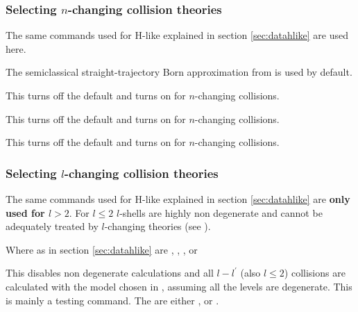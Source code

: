 

\subsubsection{Selecting $n$-changing collision theories}

The same commands used for H-like explained in section \ref{sec:datahlike} are 
used here.

 The semiclassical 
straight-trajectory Born approximation from \citet{Lebedevandbeigman1998} is 
used by default. 

 This turns off the default 
\citet{Lebedevandbeigman1998} and turns on \cite{Vriens1980} for $n$-changing 
collisions. 

 This turns off the default
\citet{Lebedevandbeigman1998} and turns on \cite{Fujimoto1978} for $n$-changing
collisions.

 This turns off the default
\citet{Lebedevandbeigman1998} and turns on \cite{VanRegemorter1962} for $n$-changing
collisions.

\subsubsection{Selecting $l$-changing collision theories}

The same commands used for H-like explained in section \ref{sec:datahlike} are {\bf only used for $l>2$}. 
For $l\leq 2$ $l$-shells are highly non degenerate and cannot be adequately treated by $l$-changing theories 
(see \citet{Guzman.II.2017}). 

 Where as in section \ref{sec:datahlike} 
 are  , , 
 ,  or 

  This disables non degenerate calculations 
and all $l-l^\prime$ (also $l\leq2$) collisions are calculated with the model chosen in , 
assuming all the levels are degenerate. This is mainly a testing command. 
The  are either ,  or .

